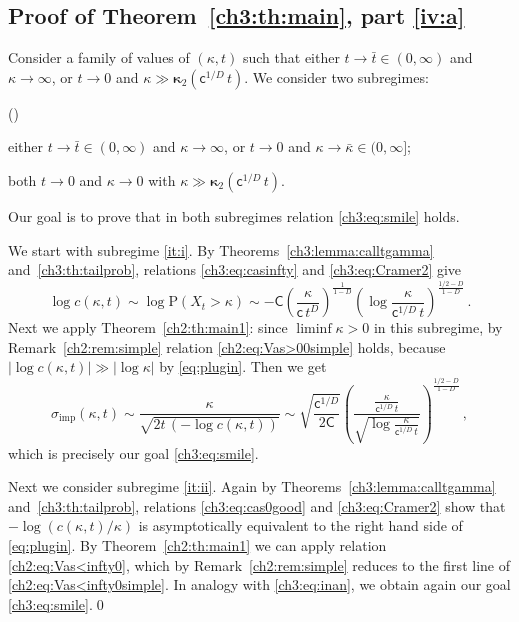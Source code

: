 \documentclass[a4paper,reqno,11pt]{amsart}
\numberwithin{equation}{section}
\newcommand{\PEfont}{\mathrm}
\renewcommand{\P}{\ensuremath{\PEfont P}}
\newcommand\sfc{\mathsf{c}}
\newcommand\sfC{\mathsf{C}}
\newenvironment{ienumerate}{%
\renewcommand{\theenumi}{\roman{enumi}}%
\renewcommand{\labelenumi}{{\rm(\theenumi)}}%
\begin{list}{\labelenumi}
	{%
	\setlength{\itemsep}{0.4em}%
	\setlength{\topsep}{0.5em}%
	\setlength\leftmargin{2.45em}%
	\setlength\labelwidth{2.05em}%
	\setlength{\labelsep}{0.4em}%
	\usecounter{enumi}%
	}%
	}%
{\end{list}
}
\newcommand\imp{\mathrm{imp}}
\newcommand\bkappa{\boldsymbol{\kappa}}
\begin{document}
\subsection{Proof of Theorem~\ref{ch3:th:main}, part \eqref{iv:a}}

Consider a family of values of $(\kappa,t)$
such that either $t \to \bar t \in (0,\infty)$ and $\kappa \to \infty$, or
$t \to 0$ and $\kappa \gg \bkappa_2(\sfc^{1/D} \, t)$.
We consider two subregimes:
\begin{ienumerate}
\item \label{it:i}
either $t \to \bar t \in (0,\infty)$ and $\kappa \to \infty$, or
$t \to 0$ and $\kappa \to \bar\kappa \in (0,\infty]$;

\item \label{it:ii}
both $t \to 0$ and $\kappa \to 0$ with $\kappa \gg \bkappa_2(\sfc^{1/D} \, t)$.
\end{ienumerate}
Our goal is to prove that in both subregimes
relation \eqref{ch3:eq:smile} holds.

We start with subregime \eqref{it:i}.
By Theorems~\ref{ch3:lemma:calltgamma}
and~\ref{ch3:th:tailprob}, relations \eqref{ch3:eq:casinfty}
and \eqref{ch3:eq:Cramer2} give
\begin{equation} \label{eq:plugin}
	\log c(\kappa,t) \sim \log \P(X_t > \kappa)
	\sim 
	- \sfC \left( \frac{\kappa}{ \sfc \, t^D}\right)^{\frac{1}{1-D}}
	\left(\log \frac{\kappa}{ \sfc^{1/D} \, t}\right)^{\frac{1/2-D}{1-D}}  \,.
\end{equation}
Next we apply Theorem~\ref{ch2:th:main1}:
since $\liminf\kappa > 0$ in this subregime,
by Remark~\ref{ch2:rem:simple} relation \eqref{ch2:eq:Vas>00simple}
holds, because
$|\log c(\kappa,t)| \gg |\log \kappa|$ by \eqref{eq:plugin}. Then we get
\begin{equation} \label{ch3:eq:inan}
	\sigma_\imp(\kappa,t) \sim \frac{\kappa}{\sqrt{2t\, (-\log  c(\kappa,t) )}}
	\sim \sqrt{\frac{ \sfc^{1/D}}{2 \sfC}} 
	\left(\frac{\frac{\kappa}{ \sfc^{1/D} \, t}}
	{\sqrt{\log \frac{\kappa}{ \sfc^{1/D} \, t}}}\right)^{\frac{1/2-D}{1-D}}  \,,
\end{equation}
which is precisely our goal \eqref{ch3:eq:smile}.

Next we consider subregime \eqref{it:ii}.
Again by Theorems~\ref{ch3:lemma:calltgamma}
and~\ref{ch3:th:tailprob}, relations \eqref{ch3:eq:cas0good}
and \eqref{ch3:eq:Cramer2} show that $-\log (c(\kappa,t)/\kappa)$
is asymptotically equivalent to the right hand side of 
\eqref{eq:plugin}. By Theorem~\ref{ch2:th:main1} we can apply
relation \eqref{ch2:eq:Vas<infty0}, which
by Remark~\ref{ch2:rem:simple} reduces to the first
line of \eqref{ch2:eq:Vas<infty0simple}. In analogy with
\eqref{ch3:eq:inan}, we obtain again our goal \eqref{ch3:eq:smile}.\qed
\end{document}
